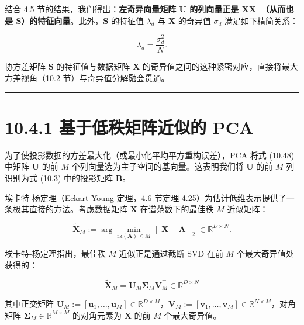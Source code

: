 结合 4.5 节的结果，我们得出：\textbf{左奇异向量矩阵 $ \boldsymbol{U} $ 的列向量正是 $ \boldsymbol{X}\boldsymbol{X}^\top $（从而也是 $ \boldsymbol{S} $）的特征向量}。此外，$ \boldsymbol{S} $ 的特征值 $ \lambda_d $ 与 $ \boldsymbol{X} $ 的奇异值 $ \sigma_d $ 满足如下精简关系：

\begin{equation}
\lambda_d = \frac{\sigma_d^2}{N} .
\tag{10.49}
\end{equation}

协方差矩阵 $ \boldsymbol{S} $ 的特征值与数据矩阵 $ \boldsymbol{X} $ 的奇异值之间的这种紧密对应，直接将最大方差视角（10.2 节）与奇异值分解融会贯通。

\medskip\hrule\medskip

\section*{10.4.1 基于低秩矩阵近似的 PCA}

为了使投影数据的方差最大化（或最小化平均平方重构误差），PCA 将式 (10.48) 中矩阵 $ \boldsymbol{U} $ 的前 $ M $ 个列向量选为主子空间的基向量。这表明我们将 $ \boldsymbol{U} $ 的前 $ M $ 列识别为式 (10.3) 中的投影矩阵 $ \boldsymbol{B} $。

埃卡特-杨定理（Eckart-Young 定理，4.6 节定理 4.25）为估计低维表示提供了一条极其直接的方法。考虑数据矩阵 $ \boldsymbol{X} $ 在谱范数下的最佳秩 $ M $ 近似矩阵：

\begin{equation}
\tilde{\boldsymbol{X}}_M := \arg\min_{\text{rk}(\boldsymbol{A}) \leqslant M} \|\boldsymbol{X} - \boldsymbol{A}\|_2 \in \mathbb{R}^{D \times N} .
\tag{10.50}
\end{equation}

埃卡特-杨定理指出，最佳秩 $ M $ 近似正是通过截断 SVD 在前 $ M $ 个最大奇异值处获得的：

\begin{equation}
\tilde{\boldsymbol{X}}_M = \boldsymbol{U}_M \boldsymbol{\Sigma}_M \boldsymbol{V}_M^\top \in \mathbb{R}^{D \times N}
\tag{10.51}
\end{equation}

其中正交矩阵 $ \boldsymbol{U}_M := [\boldsymbol{u}_1, \ldots, \boldsymbol{u}_M] \in \mathbb{R}^{D \times M} $，$ \boldsymbol{V}_M := [\boldsymbol{v}_1, \ldots, \boldsymbol{v}_M] \in \mathbb{R}^{N \times M} $，对角矩阵 $ \boldsymbol{\Sigma}_M \in \mathbb{R}^{M \times M} $ 的对角元素为 $ \boldsymbol{X} $ 的前 $ M $ 个最大奇异值。

